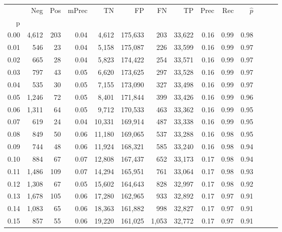 \begin{tabular}{rrrrrrrrrrrrrr}
\toprule
{} &    Neg &    Pos & mPrec &       TN &       FP &      FN &      TP &  Prec &   Rec & $\hat{p}$ \\
p    &        &        &       &          &          &         &         &       &       &           \\
\midrule
0.00 &  4,612 &    203 &  0.04 &    4,612 &  175,633 &     203 &  33,622 &  0.16 &  0.99 &      0.98 \\
0.01 &    546 &     23 &  0.04 &    5,158 &  175,087 &     226 &  33,599 &  0.16 &  0.99 &      0.97 \\
0.02 &    665 &     28 &  0.04 &    5,823 &  174,422 &     254 &  33,571 &  0.16 &  0.99 &      0.97 \\
0.03 &    797 &     43 &  0.05 &    6,620 &  173,625 &     297 &  33,528 &  0.16 &  0.99 &      0.97 \\
0.04 &    535 &     30 &  0.05 &    7,155 &  173,090 &     327 &  33,498 &  0.16 &  0.99 &      0.97 \\
0.05 &  1,246 &     72 &  0.05 &    8,401 &  171,844 &     399 &  33,426 &  0.16 &  0.99 &      0.96 \\
0.06 &  1,311 &     64 &  0.05 &    9,712 &  170,533 &     463 &  33,362 &  0.16 &  0.99 &      0.95 \\
0.07 &    619 &     24 &  0.04 &   10,331 &  169,914 &     487 &  33,338 &  0.16 &  0.99 &      0.95 \\
0.08 &    849 &     50 &  0.06 &   11,180 &  169,065 &     537 &  33,288 &  0.16 &  0.98 &      0.95 \\
0.09 &    744 &     48 &  0.06 &   11,924 &  168,321 &     585 &  33,240 &  0.16 &  0.98 &      0.94 \\
0.10 &    884 &     67 &  0.07 &   12,808 &  167,437 &     652 &  33,173 &  0.17 &  0.98 &      0.94 \\
0.11 &  1,486 &    109 &  0.07 &   14,294 &  165,951 &     761 &  33,064 &  0.17 &  0.98 &      0.93 \\
0.12 &  1,308 &     67 &  0.05 &   15,602 &  164,643 &     828 &  32,997 &  0.17 &  0.98 &      0.92 \\
0.13 &  1,678 &    105 &  0.06 &   17,280 &  162,965 &     933 &  32,892 &  0.17 &  0.97 &      0.91 \\
0.14 &  1,083 &     65 &  0.06 &   18,363 &  161,882 &     998 &  32,827 &  0.17 &  0.97 &      0.91 \\
0.15 &    857 &     55 &  0.06 &   19,220 &  161,025 &   1,053 &  32,772 &  0.17 &  0.97 &      0.91 \\

\end{tabular}
